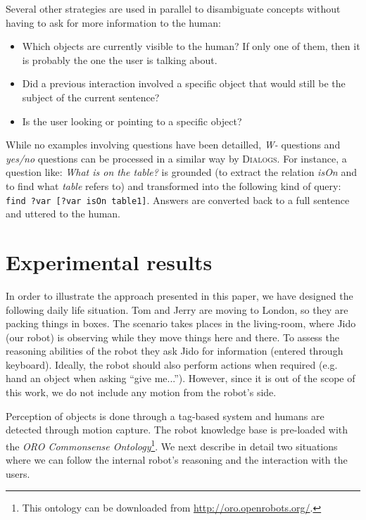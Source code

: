 Several other strategies are used in parallel to disambiguate concepts without
having to ask for more information to the human: 

\begin{itemize}
	\item Which objects are currently visible to the human? If only one of
	them, then it is probably the one the user is talking about. 
	\item Did a previous interaction involved a specific object that would
	still be the subject of the current sentence?
	\item Is the user looking or pointing to a specific object?
\end{itemize}
 
While no examples involving questions have been detailled, \emph{W-} questions
and \emph{yes/no} questions can be processed in a similar way by
\textsc{Dialogs}. For instance, a question like: \emph{What is on the table?}
is grounded (to extract the relation \emph{isOn} and to find what \emph{table}
refers to) and transformed into the following kind of query: {\tt find ?var [?var isOn
table1]}.  Answers are converted back to a full sentence and uttered to the
human.

\section{Experimental results}
\label{experiment}

In order to illustrate the approach presented in this paper, we have designed
the following daily life situation. Tom and Jerry are moving to London, so they
are packing things in boxes. The scenario takes places in the living-room,
where Jido (our robot) is observing while they move things here and there. To
assess the reasoning abilities of the robot they ask Jido for information
(entered through keyboard). Ideally, the robot should also perform actions when
required (e.g. hand an object when asking ``give me...''). However, since it is
out of the scope of this work, we do not include any motion from the robot's
side.

Perception of objects is done through a tag-based system and humans are
detected through motion capture. The robot knowledge base is pre-loaded with
the \emph{ORO Commonsense Ontology}\footnote{This ontology can be downloaded
from \url{http://oro.openrobots.org/}.}.  We next describe in detail two
situations where we can follow the internal robot's reasoning and the
interaction with the users.

